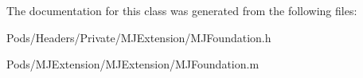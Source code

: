 The documentation for this class was generated from the following files\+:\begin{DoxyCompactItemize}
\item 
Pods/\+Headers/\+Private/\+M\+J\+Extension/M\+J\+Foundation.\+h\item 
Pods/\+M\+J\+Extension/\+M\+J\+Extension/M\+J\+Foundation.\+m\end{DoxyCompactItemize}
